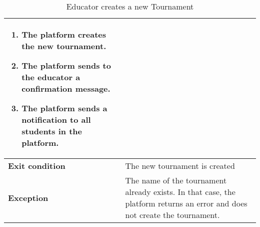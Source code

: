 \begin{enumerate}[label=\textbf{UC\arabic*}:,ref=UC\arabic*,leftmargin=1.3cm]
{\begin{table}[H]
\begin{tabular}{|l|p{11.9cm}|}
\begin{enumerate}[label=\arabic*.]
                              \item The platform creates the new tournament.
                              \item The platform sends to the educator a confirmation message.
                              \item The platform sends a notification to all students in the platform.
                        \end{enumerate} \\\hline
                        \textbf{Exit condition}  & The new tournament is created                                                                     \\\hline
                        \textbf{Exception}       & The name of the tournament already exists.
                        In that case, the platform returns an error and does not create the tournament.                                              \\\hline
                  \end{tabular}
                  \caption{Educator creates a new Tournament }
                  \label{table:Educator creates a new Tournament }
            \end{table}
            \begin{adjustbox}{
                        max size={\textwidth}{},
                        caption={Educator creates a new Tournament},
                        label={fig:Educator creates a new Tournament},
                        figure=H}
                  \centering
            \end{adjustbox}
            \pagebreak
      }
\end{enumerate}
